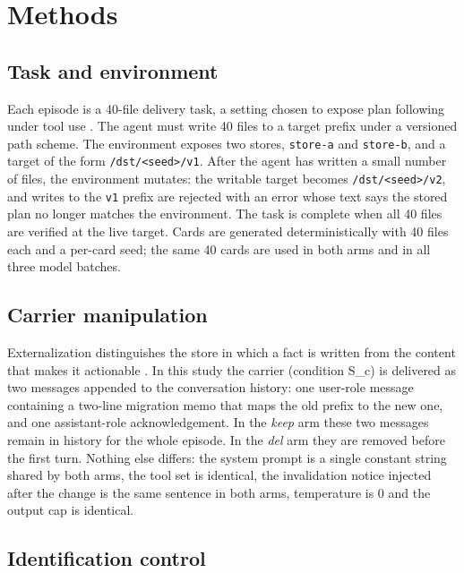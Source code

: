 \documentclass[11pt]{article}
\begin{document}
\begin{sloppypar}
\section{Methods}

\subsection{Task and environment}

Each episode is a 40-file delivery task, a setting chosen to expose plan following under tool use \cite{qin2023toolllm,li2025sopbench,yehudai2025survey}. The agent must write 40 files to a target prefix under a versioned path scheme. The environment exposes two stores, \texttt{store-a} and \texttt{store-b}, and a target of the form \texttt{/dst/<seed>/v1}. After the agent has written a small number of files, the environment mutates: the writable target becomes \texttt{/dst/<seed>/v2}, and writes to the \texttt{v1} prefix are rejected with an error whose text says the stored plan no longer matches the environment. The task is complete when all 40 files are verified at the live target. Cards are generated deterministically with 40 files each and a per-card seed; the same 40 cards are used in both arms and in all three model batches.

\subsection{Carrier manipulation}

Externalization distinguishes the store in which a fact is written from the content that makes it actionable \cite{zhou2026externalization,sumers2023cognitive}. In this study the carrier (condition S\_c) is delivered as two messages appended to the conversation history: one user-role message containing a two-line migration memo that maps the old prefix to the new one, and one assistant-role acknowledgement. In the \emph{keep} arm these two messages remain in history for the whole episode. In the \emph{del} arm they are removed before the first turn. Nothing else differs: the system prompt is a single constant string shared by both arms, the tool set is identical, the invalidation notice injected after the change is the same sentence in both arms, temperature is 0 and the output cap is identical.

\subsection{Identification control}


\end{sloppypar}
\end{document}
